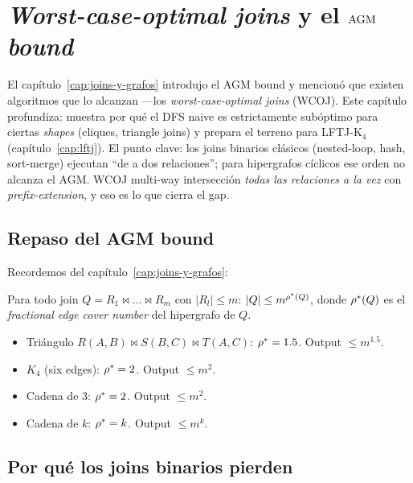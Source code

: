 \chapter{\emph{Worst-case-optimal joins} y el \(\mathrm{AGM}\) \emph{bound}}
\label{cap:wcoj}

\begin{intuicion}
El capítulo~\ref{cap:joins-y-grafos} introdujo el AGM bound y
mencionó que existen algoritmos que lo alcanzan ---los
\emph{worst-case-optimal joins} (WCOJ). Este capítulo profundiza:
muestra por qué el DFS naive es estrictamente subóptimo para
ciertas \emph{shapes} (cliques, triangle joins) y prepara el
terreno para LFTJ-K\(_4\) (capítulo~\ref{cap:lftj}). El punto
clave: los joins binarios clásicos
(nested-loop, hash, sort-merge) ejecutan ``de a dos relaciones'';
para hipergrafos cíclicos ese orden no alcanza el AGM. WCOJ
multi-way intersección \emph{todas las relaciones a la vez} con
\emph{prefix-extension}, y eso es lo que cierra el gap.
\end{intuicion}

\section{Repaso del AGM bound}

Recordemos del capítulo~\ref{cap:joins-y-grafos}:

\begin{theorem}[AGM]
Para todo join \(Q = R_1 \bowtie \dots \bowtie R_m\) con
\(|R_l| \leq m\):
\(|Q| \leq m^{\rho^{*}(Q)}\),
donde \(\rho^{*}(Q)\) es el \emph{fractional edge cover number} del
hipergrafo de \(Q\).
\end{theorem}

\begin{itemize}
    \item Triángulo \(R(A,B) \bowtie S(B,C) \bowtie T(A,C)\):
    \(\rho^{*} = 1.5\). Output \(\leq m^{1.5}\).
    \item \(K_4\) (six edges): \(\rho^{*} = 2\). Output
    \(\leq m^2\).
    \item Cadena de 3: \(\rho^{*} = 2\). Output \(\leq m^2\).
    \item Cadena de \(k\): \(\rho^{*} = k\). Output \(\leq m^k\).
\end{itemize}

\section{Por qué los joins binarios pierden}

